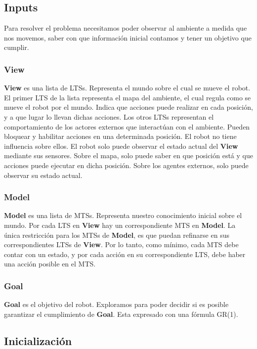 \subsection{Inputs}

Para resolver el problema necesitamos poder observar al ambiente a medida que nos movemos, saber con que información inicial 
contamos y tener un objetivo que cumplir.

\subsubsection{View}
\textbf{View} es una lista de LTSs. Representa el mundo sobre el cual se mueve el robot.
El primer LTS de la lista representa el mapa del ambiente, el cual regula como se mueve el robot por el mundo. Indica que acciones
puede realizar en cada posición, y a que lugar lo llevan dichas acciones.
Los otros LTSs representan el comportamiento de los actores externos que interactúan con el ambiente. Pueden bloquear y habilitar
acciones en una determinada posición. El robot no tiene influencia sobre ellos.
El robot solo puede observar el estado actual del \textbf{View} mediante sus sensores. Sobre el mapa, solo puede saber en que posición está
y que acciones puede ejecutar en dicha posición. Sobre los agentes externos, solo puede observar su estado actual.

\subsubsection{Model}
\textbf{Model} es una lista de MTSs. Representa nuestro conocimiento inicial sobre el mundo. Por cada LTS en \textbf{View} hay un correspondiente MTS
en \textbf{Model}.
La única restricción para los MTSs de \textbf{Model}, es que puedan refinarse en sus correspondientes LTSs de \textbf{View}. Por lo tanto, como mínimo,
cada MTS debe contar con un estado, y por cada acción en su correspondiente LTS, debe haber una acción posible en el MTS.

\subsubsection{Goal}
\textbf{Goal} es el objetivo del robot. Exploramos para poder decidir si es posible garantizar el cumplimiento de \textbf{Goal}. Esta expresado con una 
fórmula GR\big(1\big).

\subsection{Inicialización}

